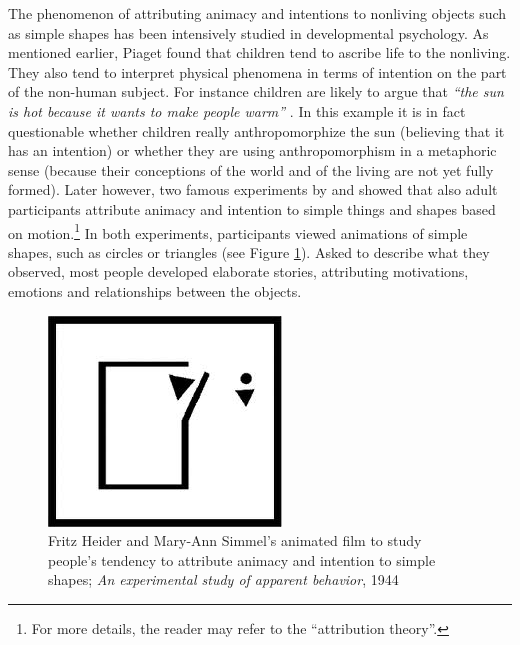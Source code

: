 \documentclass{frontiersSCNS} %
\begin{document}
The phenomenon of attributing animacy and intentions to nonliving objects such as simple shapes has been intensively studied in developmental psychology. As mentioned earlier, Piaget found that children tend to ascribe life to the nonliving. They also tend to interpret physical phenomena in terms of intention on the part of the non-human subject. For instance children are likely to argue that \textit{``the sun is hot because it wants to make people warm''} \citep{leeds_childrens_1992}. In this example it is in fact questionable whether children really anthropomorphize the sun (believing that it has an intention) or whether they are using anthropomorphism in a metaphoric sense (because their conceptions of the world and of the living are not yet fully formed). Later however, two famous experiments by \cite{heider_experimental_1944} and \cite{michotte_perception_1963} showed that also adult participants attribute animacy and intention to simple things and shapes based on motion.\footnote{For more details, the reader may refer to the ``attribution theory''.} In both experiments, participants viewed animations of simple shapes, such as circles or triangles (see Figure \ref{fig:animacy_attribution}). Asked to describe what they observed, most people developed elaborate stories, attributing motivations, emotions and relationships between the objects.

\begin{figure}[h]\centering
  \includegraphics[scale=0.6]{heider-simmel_animation.jpeg}
 \caption{Fritz Heider and Mary-Ann Simmel's animated film to study people's tendency to attribute animacy and intention to simple shapes; \textit{An experimental study of apparent behavior}, 1944}
 \label{fig:animacy_attribution}       %
 \end{figure}
\end{document}
